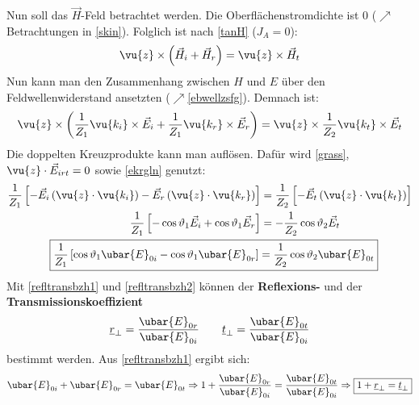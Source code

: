 			        Nun soll das $\vec{H}$-Feld betrachtet werden. Die Oberflächenstromdichte ist 0 ($\nearrow$Betrachtungen in \ref{skin}). Folglich ist nach \ref{tanH} ($J_A=0$):
			        \begin{equation}
			        	\vu{z}\times\left(\vec{H}_i+\vec{H}_r\right)=\vu{z}\times\vec{H}_t
			        \end{equation}
			        Nun kann man den Zusammenhang zwischen $H$ und $E$ über den Feldwellenwiderstand ansetzten ($\nearrow$\ref{ebwellzsfg}). Demnach ist:
			        \begin{equation}       	\vu{z}\times\left(\frac{1}{Z_1}\vu{{k_i}}\times\vec{E}_i+\frac{1}{Z_1}\vu{{k_r}}\times\vec{E}_r\right)=\vu{z}\times\frac{1}{Z_2}\vu{{k_t}}\times\vec{E}_t
			        \end{equation}
			   Die doppelten Kreuzprodukte kann man auflösen. Dafür wird \ref{grass}, \(\vu{z}\cdot \vec{E}_{irt}=0\) sowie \ref{ekrgln} genutzt:
			        \begin{align}
				        \frac{1}{Z_1}\left[   - \vec{E}_i\left(\vu{z}\cdot \vu{{k_i}}  \right)  - \vec{E}_r\left(\vu{z}\cdot \vu{{k_r}}  \right) \right] & = \frac{1}{Z_2}\left[   - \vec{E}_t\left(\vu{z}\cdot \vu{{k_t}}  \right)\right] \nonumber\\
				        \frac{1}{Z_1}\left[   - \cos\vartheta_1\vec{E}_i  +\cos\vartheta_1 \vec{E}_r \right]                                             & = -\frac{1}{Z_2} \cos\vartheta_2 \vec{E}_t                                    \nonumber  \\
				        \Aboxed{\frac{1}{Z_1}\left[   \cos\vartheta_1\ubar{E}_{0i}  -\cos\vartheta_1 \ubar{E}_{0r} \right]                               & = \frac{1}{Z_2} \cos\vartheta_2 \ubar{E}_{0t}}\label{refltransbzh2}
			        \end{align}
			   Mit \ref{refltransbzh1} und \ref{refltransbzh2} können der \textbf{Reflexions-} und der \textbf{Transmissionskoeffizient}
			        \begin{equation}
				        \underline{r}_\perp = \frac{\ubar{E}_{0r}}{\ubar{E}_{0i}} \qquad \underline{t}_\perp = \frac{\ubar{E}_{0t}}{\ubar{E}_{0i}} 
			        \end{equation}
			        bestimmt werden.
			   Aus \ref{refltransbzh1} ergibt sich:
			        \begin{equation}
				        \ubar{E}_{0i} + \ubar{E}_{0r}= \ubar{E}_{0t} \Rightarrow  1+ \frac{\ubar{E}_{0r}}{\ubar{E}_{0i}}= \frac{\ubar{E}_{0t}}{\ubar{E}_{0i}} \Rightarrow \boxed{1+\underline{r}_\perp = \underline{t}_\perp}
			        \end{equation}

